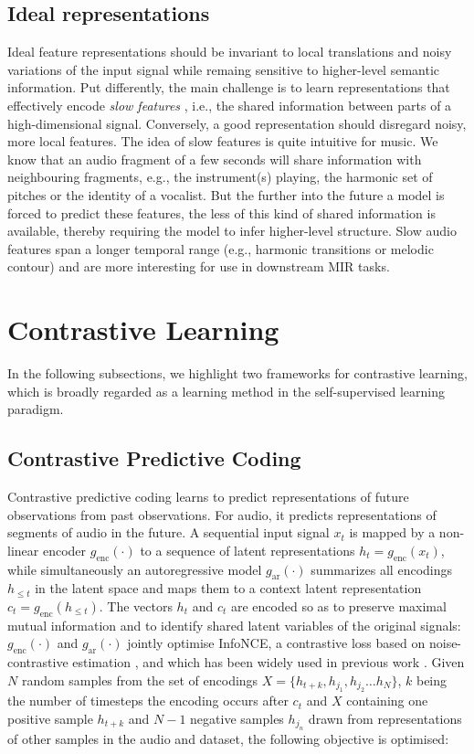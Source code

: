 \subsection{Ideal representations}
Ideal feature representations should be invariant to local translations and noisy variations of the input signal while remaing sensitive to higher-level semantic information. Put differently, the main challenge is to learn representations that effectively encode \textit{slow features} \cite{wiskott_slow_2002}, i.e., the shared information between parts of a high-dimensional signal. Conversely, a good representation should disregard noisy, more local features. The idea of slow features is quite intuitive for music.
We know that an audio fragment of a few seconds will share information with neighbouring fragments, e.g., the instrument(s) playing, the harmonic set of pitches or the identity of a vocalist.  But the further into the future a model is forced to predict these features, the less of this kind of shared information is available, thereby requiring the model to infer higher-level structure. Slow audio features span a longer temporal range (e.g., harmonic transitions or melodic contour) and are more interesting for use in downstream MIR tasks.

\section{Contrastive Learning}
In the following subsections, we highlight two frameworks for contrastive learning, which is broadly regarded as a learning method in the self-supervised learning paradigm.

\subsection{Contrastive Predictive Coding}
Contrastive predictive coding learns to predict representations of future observations from past observations. For audio, it predicts representations of segments of audio in the future. A sequential input signal $x_t$ is mapped by a non-linear encoder $g_{\mathrm{enc}}(\cdot)$ to a sequence of latent representations $h_t = g_{\mathrm{enc}}(x_t)$, while simultaneously an autoregressive model $g_{\mathrm{ar}}(\cdot)$ summarizes all encodings $h_{\leq t}$ in the latent space and maps them to a context latent representation $c_t = g_{\mathrm{enc}}(h_{\leq t})$. The vectors $h_t$ and $c_t$ are encoded so as to preserve maximal mutual information and to identify shared latent variables of the original signals: $g_{\mathrm{enc}}(\cdot)$ and $g_{\mathrm{ar}}(\cdot)$ jointly optimise InfoNCE, a contrastive loss based on noise-contrastive estimation \cite{gutmann_noise-contrastive_nodate}, and which has been widely used in previous work \cite{oord_representation_2019, sohn2020fixmatch, chen_simple_2020}. Given $N$ random samples from the set of encodings $X = \{h_{t+k}, h_{j_1}, h_{j_2} \hdots h_N\}$, $k$ being the number of timesteps the encoding occurs after $c_t$ and $X$ containing one positive sample $h_{t+k}$ and $N-1$ negative samples $h_{j_{n}}$ drawn from representations of other samples in the audio and dataset, the following objective is optimised:

